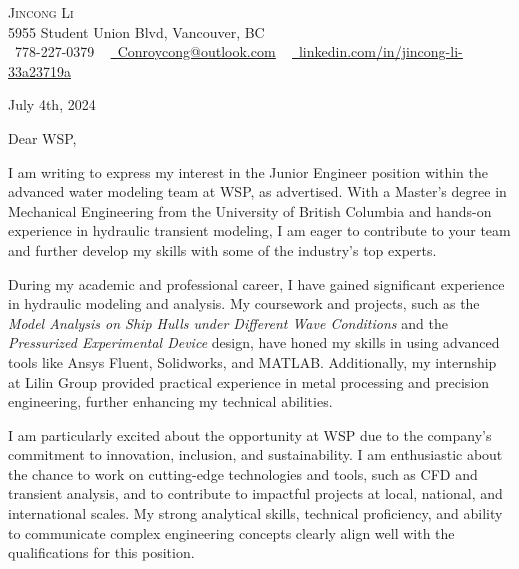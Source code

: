 \documentclass[letterpaper,11pt]{article}
\begin{document}
\begin{center}
    {\Huge \scshape Jincong Li} \\ \vspace{1pt}
    5955 Student Union Blvd, Vancouver, BC \\ \vspace{1pt}
    \small \raisebox{-0.1\height}\faPhone\ 778-227-0379 ~ \href{mailto:Conroycong@outlook.com}{\raisebox{-0.2\height}\faEnvelope\ \underline{Conroycong@outlook.com}} ~ 
    \href{https://linkedin.com/in/jincong-li-33a23719a/}{\raisebox{-0.2\height}\faLinkedin\ \underline{linkedin.com/in/jincong-li-33a23719a}}  ~
    \vspace{-8pt}
\end{center}

\begin{flushright}
July 4th, 2024 \\
\end{flushright}


Dear WSP,

I am writing to express my interest in the Junior Engineer position within the advanced water modeling team at WSP, as advertised. With a Master’s degree in Mechanical Engineering from the University of British Columbia and hands-on experience in hydraulic transient modeling, I am eager to contribute to your team and further develop my skills with some of the industry's top experts.

During my academic and professional career, I have gained significant experience in hydraulic modeling and analysis. My coursework and projects, such as the \textit{Model Analysis on Ship Hulls under Different Wave Conditions} and the \textit{Pressurized Experimental Device} design, have honed my skills in using advanced tools like Ansys Fluent, Solidworks, and MATLAB. Additionally, my internship at Lilin Group provided practical experience in metal processing and precision engineering, further enhancing my technical abilities.

I am particularly excited about the opportunity at WSP due to the company's commitment to innovation, inclusion, and sustainability. I am enthusiastic about the chance to work on cutting-edge technologies and tools, such as CFD and transient analysis, and to contribute to impactful projects at local, national, and international scales. My strong analytical skills, technical proficiency, and ability to communicate complex engineering concepts clearly align well with the qualifications for this position.
\end{document}
